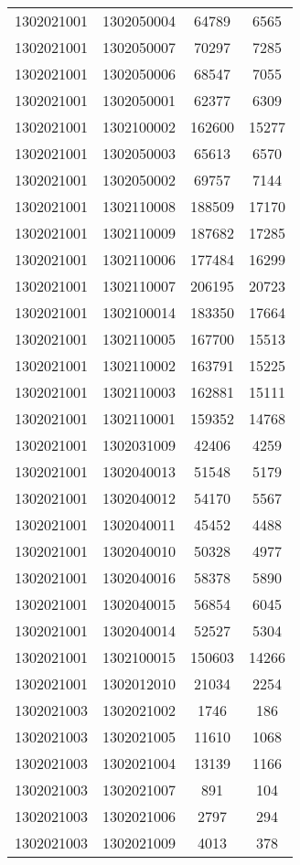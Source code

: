 \begin{longtable}{llcc}
1302021001 & 1302050004 & 64789 & 6565\\
1302021001 & 1302050007 & 70297 & 7285\\
1302021001 & 1302050006 & 68547 & 7055\\
1302021001 & 1302050001 & 62377 & 6309\\
1302021001 & 1302100002 & 162600 & 15277\\
1302021001 & 1302050003 & 65613 & 6570\\
1302021001 & 1302050002 & 69757 & 7144\\
1302021001 & 1302110008 & 188509 & 17170\\
1302021001 & 1302110009 & 187682 & 17285\\
1302021001 & 1302110006 & 177484 & 16299\\
1302021001 & 1302110007 & 206195 & 20723\\
1302021001 & 1302100014 & 183350 & 17664\\
1302021001 & 1302110005 & 167700 & 15513\\
1302021001 & 1302110002 & 163791 & 15225\\
1302021001 & 1302110003 & 162881 & 15111\\
1302021001 & 1302110001 & 159352 & 14768\\
1302021001 & 1302031009 & 42406 & 4259\\
1302021001 & 1302040013 & 51548 & 5179\\
1302021001 & 1302040012 & 54170 & 5567\\
1302021001 & 1302040011 & 45452 & 4488\\
1302021001 & 1302040010 & 50328 & 4977\\
1302021001 & 1302040016 & 58378 & 5890\\
1302021001 & 1302040015 & 56854 & 6045\\
1302021001 & 1302040014 & 52527 & 5304\\
1302021001 & 1302100015 & 150603 & 14266\\
1302021001 & 1302012010 & 21034 & 2254\\
1302021003 & 1302021002 & 1746 & 186\\
1302021003 & 1302021005 & 11610 & 1068\\
1302021003 & 1302021004 & 13139 & 1166\\
1302021003 & 1302021007 & 891 & 104\\
1302021003 & 1302021006 & 2797 & 294\\
1302021003 & 1302021009 & 4013 & 378\\

\end{longtable}
